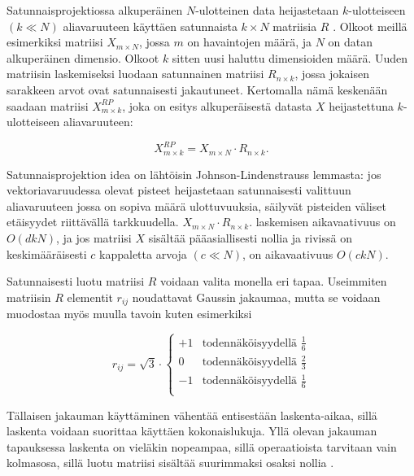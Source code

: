 Satunnaisprojektiossa alkuperäinen $N$-ulotteinen data heijastetaan $k$-ulotteiseen $(k \ll N)$ aliavaruuteen käyttäen satunnaista $k \times N$ matriisia $R$ \cite{Random}. Olkoot meillä esimerkiksi matriisi 
$X_{m\times N}$, jossa $m$ on havaintojen määrä, ja $N$ on datan alkuperäinen dimensio. Olkoot  $k$  sitten uusi haluttu dimensioiden määrä. Uuden matriisin laskemiseksi luodaan satunnainen matriisi 
$R_{n \times k}$, jossa jokaisen sarakkeen arvot ovat satunnaisesti jakautuneet. Kertomalla nämä keskenään saadaan matriisi $X_{m \times k}^{RP}$, joka on esitys alkuperäisestä datasta $X$ heijastettuna $k$-ulotteiseen 
aliavaruuteen:

\begin{equation}
X_{m \times k}^{RP} = X_{m \times N} \cdot R_{n \times k}.
\label{RP}
\end{equation}

Satunnaisprojektion idea on lähtöisin Johnson-Lindenstrauss lemmasta: jos vektoriavaruudessa olevat pisteet heijastetaan satunnaisesti valittuun aliavaruuteen jossa on sopiva määrä ulottuvuuksia, säilyvät pisteiden
väliset etäisyydet riittävällä tarkkuudella. $X_{m \times N} \cdot R_{n \times k}.$ laskemisen aikavaativuus on $O(dkN)$, ja jos matriisi $X$ sisältää pääasiallisesti nollia ja rivissä on keskimääräisesti $c$ kappaletta arvoja 
$(c \ll N)$, on aikavaativuus $O(ckN)$.

Satunnaisesti luotu matriisi $R$ voidaan valita monella eri tapaa. Useimmiten matriisin $R$ elementit $r_{ij}$ noudattavat Gaussin jakaumaa, mutta se voidaan muodostaa myös muulla tavoin kuten esimerkiksi

\begin{equation}
r_{ij} = \sqrt{3}\cdot 
\begin{cases}
 +1 &\text{todennäköisyydellä $\frac{1}{6}$} \\
 0 &\text{todennäköisyydellä $\frac{2}{3}$} \\
 -1 &\text{todennäköisyydellä $\frac{1}{6}$} \\
\end{cases}
\label{RPChoice}
\end{equation}

Tällaisen jakauman käyttäminen vähentää entisestään laskenta-aikaa, sillä laskenta voidaan suorittaa käyttäen kokonaislukuja. Yllä olevan jakauman tapauksessa laskenta on vieläkin nopeampaa, sillä operaatioista
tarvitaan vain kolmasosa, sillä luotu matriisi sisältää suurimmaksi osaksi nollia \cite{Random}.
